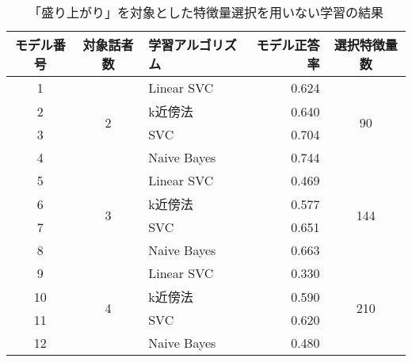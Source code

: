 \begin{table}[ptb]
    \caption{「盛り上がり」を対象とした特徴量選択を用いない学習の結果}
    \centering
    \begin{tabular}{|c|c|l|r|c|}
        \hline
        モデル番号 & 対象話者数 & 学習アルゴリズム & モデル正答率 & 選択特徴量数 \\\hline\hline
        1 & \multirow{4}{*}{2} & Linear SVC & 0.624 & \multirow{4}{*}{90} \\ \cline{1-1}\cline{3-4}
        2 & & k近傍法 & 0.640 & \\ \cline{1-1}\cline{3-4}
        3 & & SVC & 0.704 & \\ \cline{1-1}\cline{3-4}
        4 & & Naive Bayes & 0.744 & \\ \hline
        5 & \multirow{4}{*}{3} & Linear SVC & 0.469 & \multirow{4}{*}{144} \\ \cline{1-1}\cline{3-4}
        6 & & k近傍法 & 0.577 & \\ \cline{1-1}\cline{3-4}
        7 & & SVC & 0.651 & \\ \cline{1-1}\cline{3-4}
        8 & & Naive Bayes & 0.663 & \\ \hline
        9 & \multirow{4}{*}{4} & Linear SVC & 0.330 & \multirow{4}{*}{210} \\ \cline{1-1}\cline{3-4}
        10 & & k近傍法 & 0.590 & \\ \cline{1-1}\cline{3-4}
        11 & & SVC & 0.620 & \\ \cline{1-1}\cline{3-4}
        12 & & Naive Bayes & 0.480 & \\ \hline
    \end{tabular}
    \label{tab:excitement_learning_result_without_FS}
\end{table}

